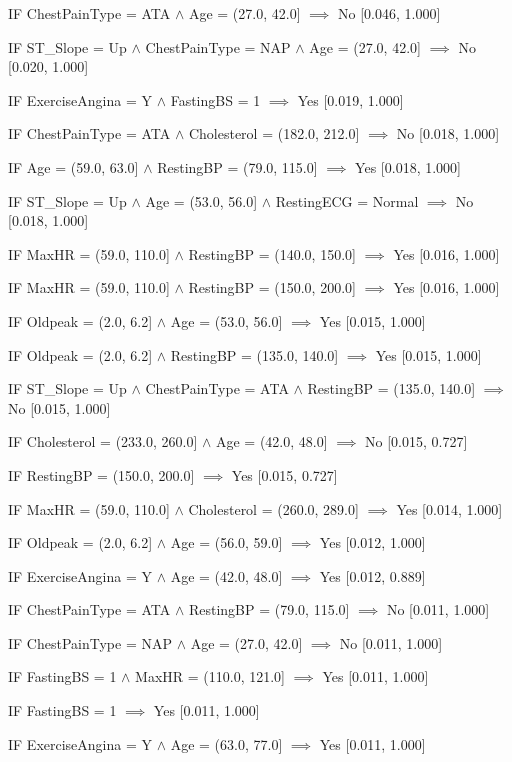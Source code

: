 IF ChestPainType = ATA $\land$ Age = (27.0, 42.0] $\implies$ No [0.046, 1.000]

IF ST_Slope = Up $\land$ ChestPainType = NAP $\land$ Age = (27.0, 42.0] $\implies$ No [0.020, 1.000]

IF ExerciseAngina = Y $\land$ FastingBS = 1 $\implies$ Yes [0.019, 1.000]

IF ChestPainType = ATA $\land$ Cholesterol = (182.0, 212.0] $\implies$ No [0.018, 1.000]

IF Age = (59.0, 63.0] $\land$ RestingBP = (79.0, 115.0] $\implies$ Yes [0.018, 1.000]

IF ST_Slope = Up $\land$ Age = (53.0, 56.0] $\land$ RestingECG = Normal $\implies$ No [0.018, 1.000]

IF MaxHR = (59.0, 110.0] $\land$ RestingBP = (140.0, 150.0] $\implies$ Yes [0.016, 1.000]

IF MaxHR = (59.0, 110.0] $\land$ RestingBP = (150.0, 200.0] $\implies$ Yes [0.016, 1.000]

IF Oldpeak = (2.0, 6.2] $\land$ Age = (53.0, 56.0] $\implies$ Yes [0.015, 1.000]

IF Oldpeak = (2.0, 6.2] $\land$ RestingBP = (135.0, 140.0] $\implies$ Yes [0.015, 1.000]

IF ST_Slope = Up $\land$ ChestPainType = ATA $\land$ RestingBP = (135.0, 140.0] $\implies$ No [0.015, 1.000]

IF Cholesterol = (233.0, 260.0] $\land$ Age = (42.0, 48.0] $\implies$ No [0.015, 0.727]

IF RestingBP = (150.0, 200.0] $\implies$ Yes [0.015, 0.727]

IF MaxHR = (59.0, 110.0] $\land$ Cholesterol = (260.0, 289.0] $\implies$ Yes [0.014, 1.000]

IF Oldpeak = (2.0, 6.2] $\land$ Age = (56.0, 59.0] $\implies$ Yes [0.012, 1.000]

IF ExerciseAngina = Y $\land$ Age = (42.0, 48.0] $\implies$ Yes [0.012, 0.889]

IF ChestPainType = ATA $\land$ RestingBP = (79.0, 115.0] $\implies$ No [0.011, 1.000]

IF ChestPainType = NAP $\land$ Age = (27.0, 42.0] $\implies$ No [0.011, 1.000]

IF FastingBS = 1 $\land$ MaxHR = (110.0, 121.0] $\implies$ Yes [0.011, 1.000]

IF FastingBS = 1 $\implies$ Yes [0.011, 1.000]

IF ExerciseAngina = Y $\land$ Age = (63.0, 77.0] $\implies$ Yes [0.011, 1.000]

